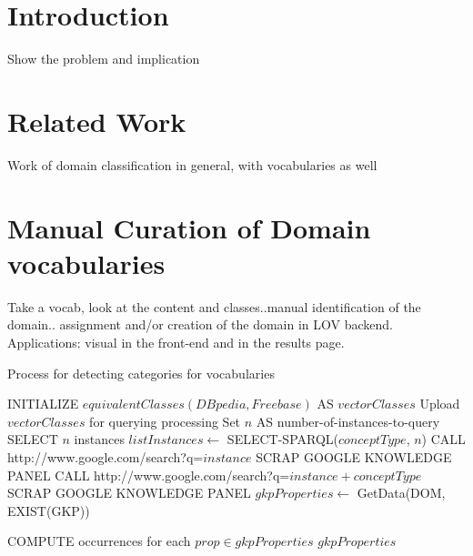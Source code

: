 \documentclass[runningheads,a4paper]{llncs}
\begin{document}

\section{Introduction}
\label{sec:introduction}




Show the problem and implication

\section{Related Work}
\label{sec:soa}

Work of domain classification in general, with vocabularies as well \\

\section{Manual Curation of Domain vocabularies}
\label{sec:curation}

Take a vocab, look at the content and classes..manual identification of the domain.. assignment and/or creation of the domain in LOV backend. Applications: visual in the front-end and in the results page. 

\begin{algorithm}[h]\scriptsize
\caption{Process for detecting categories for vocabularies} \label{experiment}
\begin{algorithmic}[1]
    \STATE INITIALIZE $equivalentClasses(DBpedia,Freebase) $ AS $vectorClasses$
    \STATE Upload $vectorClasses$ for querying processing
    \STATE Set $n$ AS number-of-instances-to-query
	\STATE SELECT $n$ instances
	\STATE $listInstances \leftarrow$ SELECT-SPARQL($conceptType$, $n$)
			\STATE CALL http://www.google.com/search?q=$instance$
				\STATE SCRAP GOOGLE KNOWLEDGE PANEL
			\ELSE
				\STATE CALL http://www.google.com/search?q=$instance + conceptType$
 				\STATE SCRAP GOOGLE KNOWLEDGE PANEL
			\ENDIF
			\STATE $gkpProperties \leftarrow$ GetData(DOM, EXIST(GKP))
			
		\ENDFOR
	\STATE COMPUTE occurrences for each $prop \in gkpProperties$
    \ENDFOR
    \RETURN $gkpProperties$
\end{algorithmic}
\end{algorithm}
\end{document}
